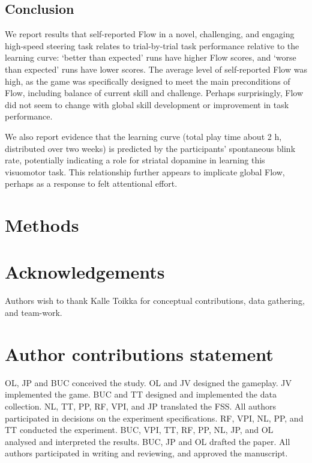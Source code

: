 \documentclass[fleqn,10pt]{wlscirep}
\begin{document}
\subsection*{Conclusion}

We report results that self-reported Flow in a novel, challenging, and engaging high-speed steering task relates to trial-by-trial task performance relative to the learning curve: `better than expected' runs have higher Flow scores, and `worse than expected' runs have lower scores. The average level of self-reported Flow was high, as the game was specifically designed to meet the main preconditions of Flow, including balance of current skill and challenge. Perhaps surprisingly, Flow did not seem to change with global skill development or improvement in task performance.

We also report evidence that the learning curve (total play time about 2 h, distributed over two weeks) is predicted by the participants' spontaneous blink rate, potentially indicating a role for striatal dopamine in learning this visuomotor task. This relationship further appears to implicate global Flow, perhaps as a response to felt attentional effort.


\section*{Methods}






\section*{Acknowledgements}
Authors wish to thank Kalle Toikka for conceptual contributions, data gathering, and team-work.


\section*{Author contributions statement}
OL, JP and BUC conceived the study.
OL and JV designed the gameplay.
JV implemented the game.
BUC and TT designed and implemented the data collection.
NL, TT, PP, RF, VPI, and JP translated the FSS.
All authors participated in decisions on the experiment specifications.
RF, VPI, NL, PP, and TT conducted the experiment.
BUC, VPI, TT, RF, PP, NL, JP, and OL analysed and interpreted the results.
BUC, JP and OL drafted the paper.
All authors participated in writing and reviewing, and approved the manuscript.
\end{document}
